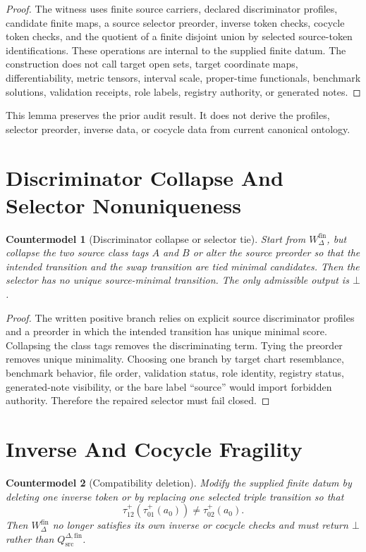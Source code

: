 \documentclass[11pt]{article}
\newcommand{\Qdisc}{Q_{\mathrm{src}}^{\Delta,\mathrm{fin}}}
\newcommand{\Bot}{\bot}
\newcommand{\Wfin}{W_{\Delta}^{\mathrm{fin}}}
\newtheorem{countermodel}{Countermodel}
\begin{document}
\begin{proof}
The witness uses finite source carriers, declared discriminator profiles,
candidate finite maps, a source selector preorder, inverse token checks,
cocycle token checks, and the quotient of a finite disjoint union by selected
source-token identifications. These operations are internal to the supplied
finite datum. The construction does not call target open sets, target
coordinate maps, differentiability, metric tensors, interval scale,
proper-time functionals, benchmark solutions, validation receipts, role
labels, registry authority, or generated notes.
\end{proof}

This lemma preserves the prior audit result. It does not derive the profiles,
selector preorder, inverse data, or cocycle data from current canonical
ontology.

\section{Discriminator Collapse And Selector Nonuniqueness}

\begin{countermodel}[Discriminator collapse or selector tie]
Start from \(\Wfin\), but collapse the two source class tags \(A\) and \(B\)
or alter the source preorder so that the intended transition and the swap
transition are tied minimal candidates. Then the selector has no unique
source-minimal transition. The only admissible output is \(\Bot\).
\end{countermodel}

\begin{proof}
The written positive branch relies on explicit source discriminator profiles
and a preorder in which the intended transition has unique minimal score.
Collapsing the class tags removes the discriminating term. Tying the preorder
removes unique minimality. Choosing one branch by target chart resemblance,
benchmark behavior, file order, validation status, role identity, registry
status, generated-note visibility, or the bare label ``source'' would import
forbidden authority. Therefore the repaired selector must fail closed.
\end{proof}

\section{Inverse And Cocycle Fragility}

\begin{countermodel}[Compatibility deletion]
Modify the supplied finite datum by deleting one inverse token or by replacing
one selected triple transition so that
\[
  \tau_{12}^{+}(\tau_{01}^{+}(a_0)) \neq \tau_{02}^{+}(a_0).
\]
Then \(\Wfin\) no longer satisfies its own inverse or cocycle checks and must
return \(\Bot\) rather than \(\Qdisc\).
\end{countermodel}
\end{document}
